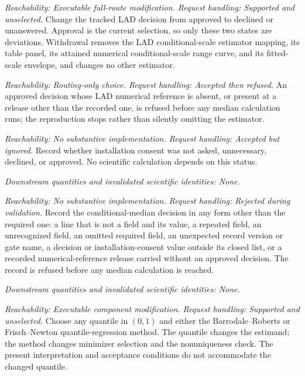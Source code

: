 \documentclass[11pt]{article}
\begin{document}
\begin{description}[style=nextline]
\item[LAD route withdrawal.]
\emph{Reachability: Executable full-route modification. Request handling: Supported and unselected.}
Change the tracked LAD decision from approved to declined or unanswered. Approval is
the current selection, so only these two states are deviations. Withdrawal removes the LAD conditional-scale estimator mapping,
its table panel, its attained numerical conditional-scale range curve, and its fitted-scale envelope, and changes no other
estimator.

\item[Approved LAD estimator without its LAD numerical reference.]
\emph{Reachability: Routing-only choice. Request handling: Accepted then refused.}
An approved decision whose LAD numerical reference is absent, or present at a release other
than the recorded one, is refused before any median calculation runs; the reproduction stops rather
than silently omitting the estimator.

\item[LAD installation-consent status.]
\emph{Reachability: No substantive implementation. Request handling: Accepted but ignored.}
Record whether installation consent was not asked, unnecessary, declined, or approved. No scientific
calculation depends on this status.

\emph{Downstream quantities and invalidated scientific identities: None.}

\item[Malformed conditional-median decision record.]
\emph{Reachability: No substantive implementation. Request handling: Rejected during validation.}
Record the conditional-median decision in any form other than the required one: a line that is not a
field and its value, a repeated field, an unrecognized field, an omitted required field, an
unexpected record version or gate name, a decision or installation-consent value outside its closed
list, or a recorded numerical-reference release carried without an approved decision. The record is
refused before any median calculation is reached.

\emph{Downstream quantities and invalidated scientific identities: None.}

\item[LAD quantile and numerical method.]
\emph{Reachability: Executable component modification. Request handling: Supported and unselected.}
Choose any quantile in \((0,1)\) and either the Barrodale--Roberts or Frisch--Newton
quantile-regression method. The quantile changes the estimand; the method changes minimizer selection
and the nonuniqueness check. The present interpretation and acceptance conditions do not accommodate
the changed quantile.


\end{description}
\end{document}
